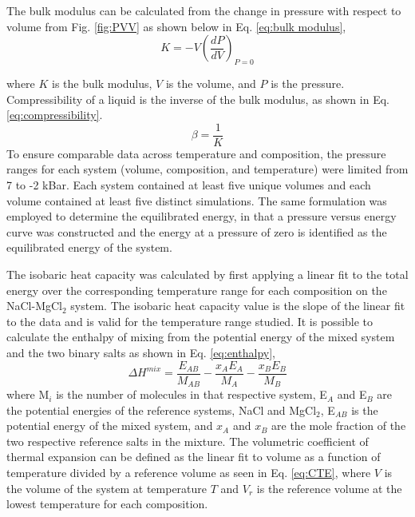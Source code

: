 \documentclass[review]{elsarticle}
\begin{document}
The bulk modulus can be calculated from the change in pressure with respect to volume from Fig. \ref{fig:PVV} as shown below in Eq. \ref{eq:bulk modulus},
\begin{equation}
\label{eq:bulk modulus}
K = -V {(\frac{dP}{dV})}_{P=0}
\end{equation}

\noindent where $K$ is the bulk modulus, $V$ is the volume, and $P$ is the pressure.  Compressibility of a liquid is the inverse of the bulk modulus, as shown in Eq. \ref{eq:compressibility}. 
\begin{equation}
\label{eq:compressibility}
\beta = \frac{1}{K}
\end{equation}
To ensure comparable data across temperature and composition, the pressure ranges for each system (volume, composition, and temperature) were limited from 7 to -2 kBar. Each system contained at least five unique volumes and each volume contained at least five distinct simulations. The same formulation was employed to determine the equilibrated energy, in that a pressure versus energy curve was constructed and the energy at a pressure of zero is identified as the equilibrated energy of the system. 


The isobaric heat capacity was calculated by first applying a linear fit to the total energy over the corresponding temperature range for each composition on the NaCl-MgCl$_2$ system. The isobaric heat capacity value is the slope of the linear fit to the data and is valid for the temperature range studied. It is possible to calculate the enthalpy of mixing from the potential energy of the mixed system and the two binary salts as shown in Eq. \ref{eq:enthalpy},
\begin{equation}
 \label{eq:enthalpy}
 \Delta H^{mix} = \frac{E_{AB}}{M_{AB}} - \frac{x_A E_A}{M_A} - \frac{x_B E_B}{M_B}
\end{equation}
where M$_i$ is the number of molecules in that respective system, E$_A$ and E$_B$ are the potential energies of the reference systems, NaCl and MgCl$_2$, E$_{AB}$ is the potential energy of the mixed system, and $x_A$ and $x_B$ are the mole fraction of the two respective reference salts in the mixture. The volumetric coefficient of thermal expansion can be defined as the linear fit to volume as a function of temperature divided by a reference volume as seen in Eq. \ref{eq:CTE}, where $V$ is the volume of the system at temperature $T$ and $V_r$ is the reference volume at the lowest temperature for each composition.
\end{document}
